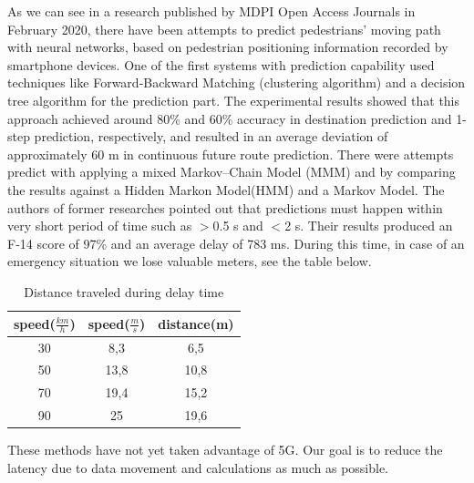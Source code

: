 \documentclass[conference]{IEEEtran}
\begin{document}
As we can see in a research published by MDPI Open Access Journals in February 2020, there have been attempts to predict pedestrians' moving path with neural networks, based on pedestrian positioning information recorded by smartphone devices. \cite{b1,b6} One of the first systems with prediction capability used techniques like Forward-Backward Matching (clustering algorithm) and a decision tree algorithm for the prediction part. The experimental results showed that this approach achieved around 80\% and
60\% accuracy in destination prediction and 1-step prediction, respectively, and resulted in an average deviation of approximately 60 m in continuous future route prediction. There were attempts predict with applying a mixed Markov–Chain Model (MMM) and by comparing the results against a Hidden Markon Model(HMM) and a Markov Model. The authors of former researches pointed out that predictions must happen within very short period of time such as $>$0.5 s and $<$2 s. Their results produced an
F-14 score of 97\% and an average delay of 783 ms. During this time, in case of an emergency situation we lose valuable meters, see the table below.
\begin{table}[h]
\begin{center}
    \begin{tabular}{ |c|c|c| } 
     \hline
     speed($\frac{km}{h}$) & speed($\frac{m}{s}$) & distance(m) \\
     \hline 
     30 & 8,3 & 6,5 \\ 
     \hline
     50 & 13,8 & 10,8 \\ 
     \hline
     70 & 19,4 & 15,2 \\ 
     \hline
     90 & 25 & 19,6 \\
     \hline 
    \end{tabular}
\end{center}
\caption{Distance traveled during delay time}
\end{table}


These methods have not yet taken advantage of 5G. Our goal is to reduce the latency due to data movement and calculations as much as possible.
\end{document}
